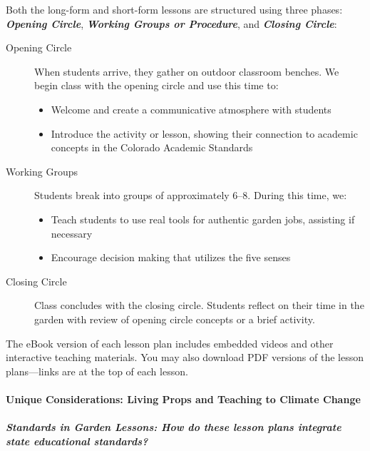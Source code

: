 \documentclass[12pt,]{article}
\providecommand{\tightlist}{%
  \setlength{\itemsep}{0pt}\setlength{\parskip}{0pt}}
\let\oldparagraph\paragraph
\renewcommand{\paragraph}[1]{\oldparagraph{#1}\mbox{}}
\let\oldsubparagraph\subparagraph
\renewcommand{\subparagraph}[1]{\oldsubparagraph{#1}\mbox{}}
\begin{document}
Both the long-form and short-form lessons are structured using three phases: \textbf{\emph{Opening Circle}}, \textbf{\emph{Working Groups or Procedure}}, and \textbf{\emph{Closing Circle}}:

\begin{description}
\item[Opening Circle]
When students arrive, they gather on outdoor classroom benches. We begin class with the opening circle and use this time to:

\begin{itemize}
\tightlist
\item
  Welcome and create a communicative atmosphere with students\\
\item
  Introduce the activity or lesson, showing their connection to academic concepts in the Colorado Academic Standards
\end{itemize}
\item[Working Groups]
Students break into groups of approximately 6--8. During this time, we:

\begin{itemize}
\tightlist
\item
  Teach students to use real tools for authentic garden jobs, assisting if necessary
\item
  Encourage decision making that utilizes the five senses
\end{itemize}
\item[Closing Circle]
Class concludes with the closing circle. Students reflect on their time in the garden with review of opening circle concepts or a brief activity.
\end{description}

The eBook version of each lesson plan includes embedded videos and other interactive teaching materials. You may also download PDF versions of the lesson plans---links are at the top of each lesson.

\hypertarget{unique-considerations-living-props-and-teaching-to-climate-change}{%
\paragraph{Unique Considerations: Living Props and Teaching to Climate Change}\label{unique-considerations-living-props-and-teaching-to-climate-change}}

\hypertarget{standards-in-garden-lessons-how-do-these-lesson-plans-integrate-state-educational-standards}{%
\subparagraph{Standards in Garden Lessons: How do these lesson plans integrate state educational standards?}\label{standards-in-garden-lessons-how-do-these-lesson-plans-integrate-state-educational-standards}}
\end{document}
